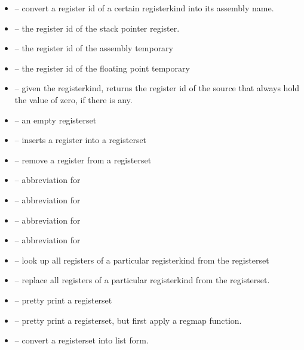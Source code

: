 \begin{itemize} 
  \item {} -- convert a register id of a certain registerkind into
its assembly name.
  \item {} -- the register id of the stack pointer register. 
  \item {} -- the register id of the assembly temporary 
  \item {} -- the register id of the floating point temporary
  \item {} -- given the registerkind, returns the register id of the
   source that always hold the value of zero, if there is any. 
  \item {} -- an empty registerset
  \item {} -- inserts a register into a registerset
  \item {} -- remove a register from a registerset
  \item {} -- abbreviation for 
  \item {} -- abbreviation for  
  \item {} -- abbreviation for 
  \item {} -- abbreviation for  
  \item {} -- look up all registers of a particular registerkind from
the registerset
  \item {} -- replace all registers of a particular registerkind
from the registerset. 
   \item {} -- pretty print a registerset 
   \item {} -- pretty print a registerset, but first
apply a regmap function.
   \item {} -- convert a registerset into list form.
\end{itemize}
